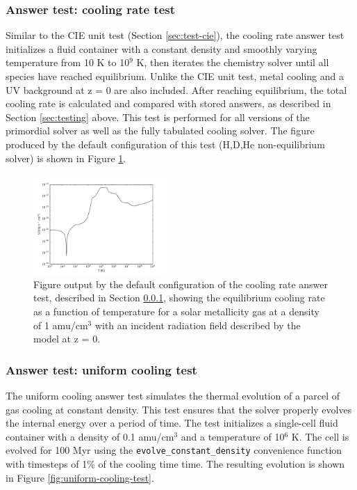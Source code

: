 \subsubsection{Answer test: cooling rate test}
\label{sec:cooling-rate-test}

Similar to the CIE unit test (Section \ref{sec:test-cie}), the cooling
rate answer test initializes a fluid container with a constant density
and smoothly varying temperature from 10 K to 10$^{9}$ K, then
iterates the chemistry solver until all species have reached
equilibrium.  Unlike the CIE unit test, metal cooling and a
\citet{2012ApJ...746..125H} UV background at z = 0 are also included.
After reaching equilibrium, the total cooling rate is calculated and
compared with stored answers, as described in Section
\ref{sec:testing} above.  This test is performed for all versions of
the primordial solver as well as the fully tabulated cooling solver.
The figure produced by the default configuration of this test
(H,D,He non-equilibrium solver) is shown in Figure
\ref{fig:cooling-rate-test}.

\begin{figure}
  \centering
  \includegraphics[width=0.45\textwidth]{cooling_rate.pdf}
  \caption{
    Figure output by the default configuration of the cooling rate
    answer test, described in Section \ref{sec:cooling-rate-test},
    showing the equilibrium cooling rate as a function of temperature
    for a solar metallicity gas at a density of 1 amu/cm$^{3}$ with an
    incident radiation field described by the
    \citet{2012ApJ...746..125H} model at z = 0.
  } \label{fig:cooling-rate-test}
\end{figure}

\subsubsection{Answer test: uniform cooling test}
\label{sec:uniform-cooling-test}

The uniform cooling answer test simulates the thermal evolution of a
parcel of gas cooling at constant density.  This test ensures that the
solver properly evolves the internal energy over a period of time.
The test initializes a single-cell fluid container with a density of
0.1 amu/cm$^{3}$ and a temperature of 10$^{6}$ K.  The cell is evolved
for 100 Myr using the \texttt{evolve\_constant\_density} convenience
function with timesteps of 1\% of the cooling time time.  The
resulting evolution is shown in Figure
\ref{fig:uniform-cooling-test}.

